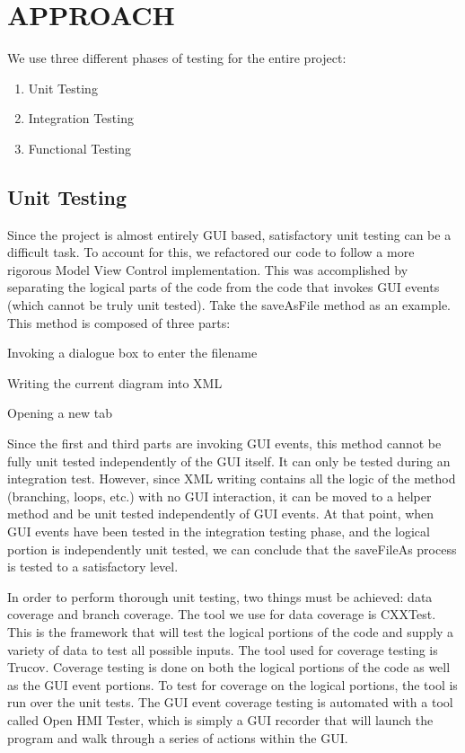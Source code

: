 \documentclass[twoside,letterpaper]{article}
\begin{document}
\section[APPROACH]{\bfseries\color{black} APPROACH}
{\color{black}
We use three different phases of testing for the entire project:

\begin{enumerate}
\item Unit Testing
\item Integration Testing
\item Functional Testing
\end{enumerate}

\subsection{Unit Testing}
Since the project is almost entirely GUI based, satisfactory unit testing can be a difficult task. To account for this, we refactored our code to follow a more rigorous Model View Control implementation. This was accomplished by separating the logical parts of the code from the code that invokes GUI events (which cannot be truly unit tested).
Take the saveAsFile method as an example. This method is composed of three parts:

\begin{list}{-}{ }
\item Invoking a dialogue box to enter the filename
\item Writing the current diagram into XML
\item Opening a new tab
\end{list}

Since the first and third parts are invoking GUI events, this method cannot be fully unit tested independently of the GUI itself. It can only be tested during an integration test. However, since XML writing contains all the logic of the method (branching, loops, etc.) with no GUI interaction, it can be moved to a helper method and be unit tested independently of GUI events. At that point, when GUI events have been tested in the integration testing phase, and the logical portion is independently unit tested, we can conclude that the saveFileAs process is tested to a satisfactory level.\newline

In order to perform thorough unit testing, two things must be achieved: data coverage and branch coverage. The tool we use for data coverage is CXXTest. This is the framework that will test the logical portions of the code and supply a variety of data to test all possible inputs.\newline
The tool used for coverage testing is Trucov. Coverage testing is done on both the logical portions of the code as well as the GUI event portions. To test for coverage on the logical portions, the tool is run over the unit tests. The GUI event coverage testing is automated with a tool called Open HMI Tester, which is simply a GUI recorder that will launch the program and walk through a series of actions within the GUI.

}
\end{document}
